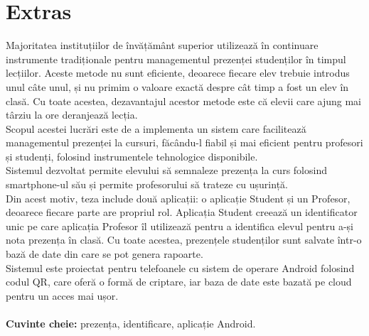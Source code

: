 \documentclass[12pt]{article}
\numberwithin{figure}{section}
\numberwithin{equation}{section}
\begin{document}
\newpage

\thispagestyle{empty}
\section*{Extras}

Majoritatea instituțiilor de învățământ superior utilizează în continuare instrumente tradiționale pentru managementul prezenței studenților în timpul lecțiilor. Aceste metode nu sunt eficiente, deoarece fiecare elev trebuie introdus unul câte unul, și nu primim o valoare exactă despre cât timp a fost un elev în clasă. Cu toate acestea, dezavantajul acestor metode este că elevii care ajung mai târziu la ore deranjează lecția.\\
Scopul acestei lucrări este de a implementa un sistem care facilitează managementul prezenței la cursuri, făcându-l fiabil și mai eficient pentru profesori și studenți, folosind instrumentele tehnologice disponibile.\\
Sistemul dezvoltat permite elevului să semnaleze prezența la curs folosind smartphone-ul său și permite profesorului să trateze cu ușurință.\\
Din acest motiv, teza include două aplicații: o aplicație Student și un Profesor, deoarece fiecare parte are propriul rol. Aplicația Student creează un identificator unic pe care aplicația Profesor îl utilizează pentru a identifica elevul pentru a-și nota prezența în clasă. Cu toate acestea, prezențele studenților sunt salvate într-o bază de date din care se pot genera rapoarte.\\
Sistemul este proiectat pentru telefoanele cu sistem de operare Android folosind codul QR, care oferă o formă de criptare, iar baza de date este bazată pe cloud pentru un acces mai ușor.\\
\\
\textbf{Cuvinte cheie:} prezența, identificare, aplicație Android.

\newpage

\thispagestyle{empty}
\end{document}

